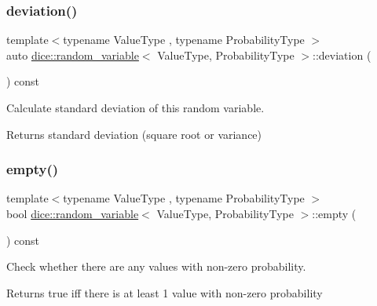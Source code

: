 \subsubsection{\texorpdfstring{deviation()}{deviation()}}
{\footnotesize\ttfamily template$<$typename Value\+Type , typename Probability\+Type $>$ \\
auto \mbox{\hyperlink{classdice_1_1random__variable}{dice\+::random\+\_\+variable}}$<$ Value\+Type, Probability\+Type $>$\+::deviation (\begin{DoxyParamCaption}{ }\end{DoxyParamCaption}) const\hspace{0.3cm}{\ttfamily [inline]}}



Calculate standard deviation of this random variable. 

\begin{DoxyReturn}{Returns}
standard deviation (square root or variance) 
\end{DoxyReturn}
\mbox{\label{classdice_1_1random__variable_a113037d3c11921f1ba1227a838781d3e}} 
\subsubsection{\texorpdfstring{empty()}{empty()}}
{\footnotesize\ttfamily template$<$typename Value\+Type , typename Probability\+Type $>$ \\
bool \mbox{\hyperlink{classdice_1_1random__variable}{dice\+::random\+\_\+variable}}$<$ Value\+Type, Probability\+Type $>$\+::empty (\begin{DoxyParamCaption}{ }\end{DoxyParamCaption}) const\hspace{0.3cm}{\ttfamily [inline]}}



Check whether there are any values with non-\/zero probability. 

\begin{DoxyReturn}{Returns}
true iff there is at least 1 value with non-\/zero probability 
\end{DoxyReturn}
\mbox{\label{classdice_1_1random__variable_a82f50939d82419d9f86901b6997ca8fe}} 
